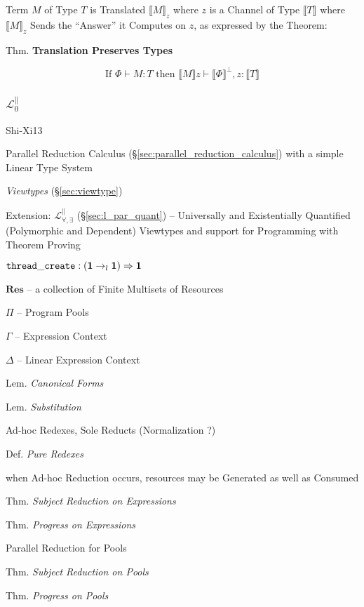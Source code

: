 Term $M$ of Type $T$ is Translated $\llbracket M \rrbracket_z$ where
$z$ is a Channel of Type $\llbracket T \rrbracket$ where $\llbracket M
\rrbracket_z$ Sends the ``Answer'' it Computes on $z$, as expressed by
the Theorem:

Thm. \textbf{Translation Preserves Types}

\[
  \text{If } \Phi \vdash M : T \text{ then }
  \llbracket M \rrbracket z \vdash \llbracket \Phi \rrbracket^\bot,
  z : \llbracket T \rrbracket
\]



\subsubsection{$\mathcal{L}^\parallel_0$}\label{sec:l_par_zero}

Shi-Xi13

Parallel Reduction Calculus (\S\ref{sec:parallel_reduction_calculus})
with a simple Linear Type System

\emph{Viewtypes} (\S\ref{sec:viewtype})

\fist Extension: $\mathcal{L}^\parallel_{\forall,\exists}$
(\S\ref{sec:l_par_quant}) -- Universally and Existentially Quantified
(Polymorphic and Dependent) Viewtypes and support for Programming with
Theorem Proving

$\mathtt{thread\_create} : (\mathbf{1} \rightarrow_l \mathbf{1})
\Rightarrow \mathbf{1}$

$\mathbf{Res}$ -- a collection of Finite Multisets of Resources

$\Pi$ -- Program Pools

$\Gamma$ -- Expression Context

$\Delta$ -- Linear Expression Context

Lem. \emph{Canonical Forms}

Lem. \emph{Substitution}

Ad-hoc Redexes, Sole Reducts (Normalization ?)

Def. \emph{Pure Redexes}

when Ad-hoc Reduction occurs, resources may be Generated as well as
Consumed

Thm. \emph{Subject Reduction on Expressions}

Thm. \emph{Progress on Expressions}

Parallel Reduction for Pools

Thm. \emph{Subject Reduction on Pools}

Thm. \emph{Progress on Pools}

